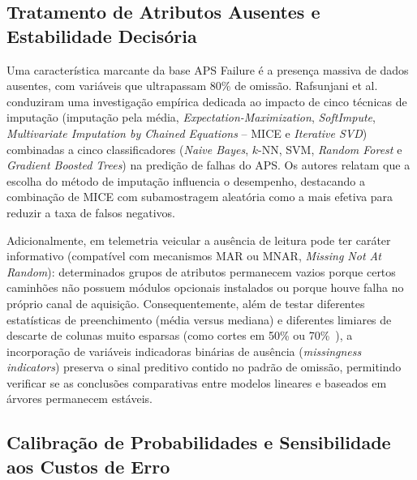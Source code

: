 \documentclass[conference]{IEEEtran}
\begin{document}
\subsection{Tratamento de Atributos Ausentes e Estabilidade Decisória}

Uma característica marcante da base APS Failure é a presença massiva de dados ausentes, com variáveis que ultrapassam 80\% de omissão. Rafsunjani et al.~\cite{rafsunjani2019} conduziram uma investigação empírica dedicada ao impacto de cinco técnicas de imputação (imputação pela média, \textit{Expectation-Maximization}, \textit{SoftImpute}, \textit{Multivariate Imputation by Chained Equations} -- MICE e \textit{Iterative SVD}) combinadas a cinco classificadores (\textit{Naive Bayes}, $k$-NN, SVM, \textit{Random Forest} e \textit{Gradient Boosted Trees}) na predição de falhas do APS. Os autores relatam que a escolha do método de imputação influencia o desempenho, destacando a combinação de MICE com subamostragem aleatória como a mais efetiva para reduzir a taxa de falsos negativos.

Adicionalmente, em telemetria veicular a ausência de leitura pode ter caráter informativo (compatível com mecanismos MAR ou MNAR, \textit{Missing Not At Random}): determinados grupos de atributos permanecem vazios porque certos caminhões não possuem módulos opcionais instalados ou porque houve falha no próprio canal de aquisição. Consequentemente, além de testar diferentes estatísticas de preenchimento (média versus mediana) e diferentes limiares de descarte de colunas muito esparsas (como cortes em 50\% ou 70\%~\cite{costtransformer2024}), a incorporação de variáveis indicadoras binárias de ausência (\textit{missingness indicators}) preserva o sinal preditivo contido no padrão de omissão, permitindo verificar se as conclusões comparativas entre modelos lineares e baseados em árvores permanecem estáveis.

\subsection{Calibração de Probabilidades e Sensibilidade aos Custos de Erro}
\end{document}
